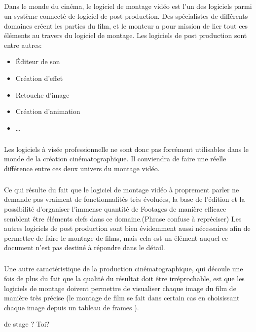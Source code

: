 \subparagraph{}

Dans le monde du cinéma, le logiciel de montage vidéo est l'un des
logiciels parmi un système connecté de logiciel de post production. Des
spécialistes de différents domaines créent les parties du film,
et le monteur a pour mission de lier tout ces éléments au travers du
logiciel de montage. Les logiciels de post production sont entre autres:

\begin{itemize} \setlength{\itemsep}{2mm}

  \item{Éditeur de son}

  \item{Création d'effet}

  \item{Retouche d'image}

  \item{Création d'animation}

  \item{\ldots}

\end{itemize}

\subparagraph{}

Les logiciels à visée professionnelle ne sont donc pas forcément
utilisables dans le monde de la création cinématographique. Il
conviendra de faire une réelle différence entre ces deux univers du
montage vidéo.

\subparagraph{}

Ce qui résulte du fait que le logiciel de montage vidéo à proprement
parler ne demande pas vraiment de fonctionnalités très évoluées, la
base de l'édition et la possibilité d'organiser l'immense quantité
de Footages de manière efficace semblent être éléments clefs dans
ce domaine.(Phrase confuse à repréciser) Les autres logiciels de post
production sont bien évidemment aussi nécessaires afin de permettre de
faire le montage de films, mais cela est un élément auquel ce document
n'est pas destiné à répondre dans le détail.

\subparagraph{}

Une autre caractéristique de la production cinématographique, qui
découle une fois de plus du fait que la qualité du résultat doit être
irréprochable, est que les logiciels de montage doivent permettre de
visualiser chaque image du film de manière très précise (le montage
de film se fait dans certain cas en choisissant chaque image depuis un
tableau de frames ).

de stage ? Toi?

